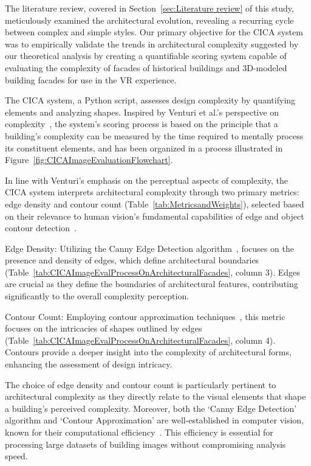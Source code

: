 The literature review, covered in Section~\ref{sec:Literature review} of this study, meticulously examined the architectural evolution, revealing a recurring cycle between complex and simple styles.
Our primary objective for the CICA system was to empirically validate the trends in architectural complexity suggested by our theoretical analysis by creating a quantifiable scoring system capable of evaluating the complexity of facades of historical buildings and 3D-modeled building facades for use in the VR experience.

The CICA system, a Python script, assesses design complexity by quantifying elements and analyzing shapes.
Inspired by Venturi et al.'s perspective on complexity~\cite{Venturi1977}, the system's scoring process is based on the principle that a building's complexity can be measured by the time required to mentally process its constituent elements, and has been organized in a process illustrated in Figure~\ref{fig:CICAImageEvaluationFlowchart}.

In line with Venturi's emphasis on the perceptual aspects of complexity, the CICA system interprets architectural complexity through two primary metrics: edge density and contour count (Table~\ref{tab:MetricsandWeights}), selected based on their relevance to human vision's fundamental capabilities of edge and object contour detection~\cite{Yang2022}.

Edge Density: Utilizing the Canny Edge Detection algorithm~\cite{EdgeOpenCV2023}, focuses on the presence and density of edges, which define architectural boundaries (Table~\ref{tab:CICAImageEvalProcessOnArchitecturalFacades}, column 3).
Edges are crucial as they define the boundaries of architectural features, contributing significantly to the overall complexity perception.

Contour Count: Employing contour approximation techniques~\cite{ContourOpenCV2023}, this metric focuses on the intricacies of shapes outlined by edges (Table~\ref{tab:CICAImageEvalProcessOnArchitecturalFacades}, column 4).
Contours provide a deeper insight into the complexity of architectural forms, enhancing the assessment of design intricacy.

The choice of edge density and contour count is particularly pertinent to architectural complexity as they directly relate to the visual elements that shape a building's perceived complexity.
Moreover, both the `Canny Edge Detection' algorithm and `Contour Approximation' are well-established in computer vision, known for their computational efficiency~\cite{Yang2022}.
This efficiency is essential for processing large datasets of building images without compromising analysis speed.

